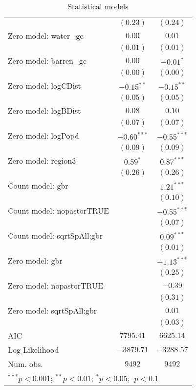 \begin{table}
\begin{center}
{\begin{tabular}{l c c}
                             & $(0.23)$      & $(0.24)$      \\
Zero model: water\_gc        & $0.00$        & $0.01$        \\
                             & $(0.01)$      & $(0.01)$      \\
Zero model: barren\_gc       & $0.00$        & $-0.01^{*}$   \\
                             & $(0.00)$      & $(0.00)$      \\
Zero model: logCDist         & $-0.15^{**}$  & $-0.15^{**}$  \\
                             & $(0.05)$      & $(0.05)$      \\
Zero model: logBDist         & $0.08$        & $0.10$        \\
                             & $(0.07)$      & $(0.07)$      \\
Zero model: logPopd          & $-0.60^{***}$ & $-0.55^{***}$ \\
                             & $(0.09)$      & $(0.09)$      \\
Zero model: region3          & $0.59^{*}$    & $0.87^{***}$  \\
                             & $(0.26)$      & $(0.26)$      \\
Count model: gbr             &               & $1.21^{***}$  \\
                             &               & $(0.10)$      \\
Count model: nopastorTRUE    &               & $-0.55^{***}$ \\
                             &               & $(0.07)$      \\
Count model: sqrtSpAll:gbr   &               & $0.09^{***}$  \\
                             &               & $(0.01)$      \\
Zero model: gbr              &               & $-1.13^{***}$ \\
                             &               & $(0.25)$      \\
Zero model: nopastorTRUE     &               & $-0.39$       \\
                             &               & $(0.31)$      \\
Zero model: sqrtSpAll:gbr    &               & $0.01$        \\
                             &               & $(0.03)$      \\
\midrule
AIC                          & $7795.41$     & $6625.14$     \\
Log Likelihood               & $-3879.71$    & $-3288.57$    \\
Num. obs.                    & $9492$        & $9492$        \\
\bottomrule
\multicolumn{3}{l}{\scriptsize{$^{***}p<0.001$; $^{**}p<0.01$; $^{*}p<0.05$; $^{\cdot}p<0.1$}}
\end{tabular}
}
\caption{Statistical models}
\label{zinb}
\end{center}
\end{table}
